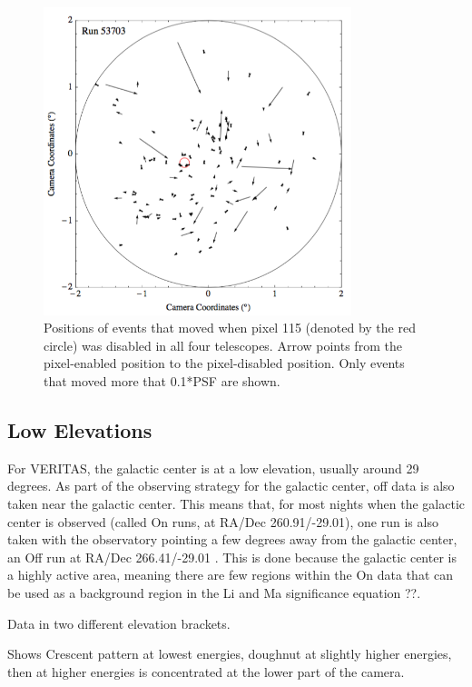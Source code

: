 \begin{figure}[h]\label{fig:dpix_move}
  \begin{center}
    \includegraphics[width=0.8\textwidth]{images/disabled_pixel/moving_events}
    \caption[Event Movement]{Positions of events that moved when pixel 115 (denoted by the red circle) was disabled in all four telescopes.  Arrow points from the pixel-enabled position to the pixel-disabled position.  Only events that moved more that 0.1*PSF are shown.}
  \end{center}
\end{figure}


\subsection{Low Elevations}
For VERITAS, the galactic center is at a low elevation, usually around 29 degrees.
As part of the observing strategy for the galactic center, off data is also taken near the galactic center.
This means that, for most nights when the galactic center is observed (called On runs, at RA/Dec 260.91/-29.01), one run is also taken with the observatory pointing a few degrees away from the galactic center, an Off run at RA/Dec 266.41/-29.01 .
This is done because the galactic center is a highly active area, meaning there are few regions within the On data that can be used as a background region in the Li and Ma significance equation ??.

Data in two different elevation brackets.

Shows Crescent pattern at lowest energies, doughnut at slightly higher energies, then at higher energies is concentrated at the lower part of the camera.

